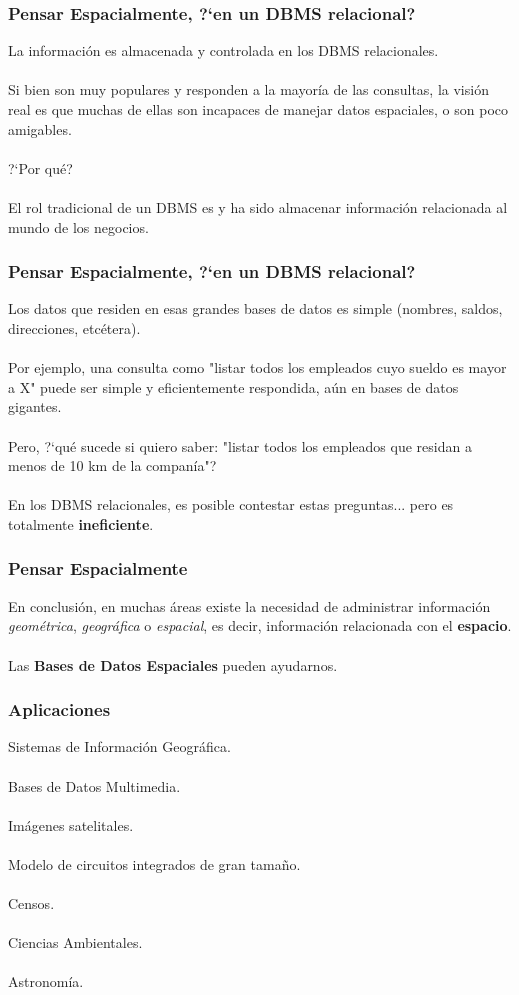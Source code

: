 \documentclass[12pt]{beamer}
\begin{document}
\begin{frame}
\frametitle{Pensar Espacialmente, ?`en un DBMS relacional?}
La informaci\'on es almacenada y controlada en los DBMS relacionales.\\
\ \\
Si bien son muy populares y responden a la mayor\'ia de las consultas, la visi\'on real es que muchas de ellas son incapaces de manejar datos espaciales, o son poco amigables.\\
\ \\
?`Por qu\'e?\\
\ \\
El rol tradicional de un DBMS es y ha sido almacenar informaci\'on relacionada al mundo de los negocios.
\end{frame}


\begin{frame}
\frametitle{Pensar Espacialmente, ?`en un DBMS relacional?}
Los datos que residen en esas grandes bases de datos es simple (nombres, saldos, direcciones, etc\'etera).\\
\ \\
Por ejemplo, una consulta como "listar todos los empleados cuyo sueldo es mayor a X" puede ser simple y eficientemente respondida, a\'un en bases de datos gigantes.\\
\ \\
Pero, ?`qu\'e sucede si quiero saber: "listar todos los empleados que residan a menos de 10 km de la compan\'ia"?\\
\ \\
En los DBMS relacionales, es posible contestar estas preguntas... pero es totalmente \textbf{ineficiente}.
\end{frame}


\begin{frame}
\frametitle{Pensar Espacialmente}
En conclusi\'on, en muchas \'areas existe la necesidad de administrar informaci\'on \textit{geom\'etrica}, \textit{geogr\'afica} o \textit{espacial}, es decir, informaci\'on relacionada con el \textbf{espacio}.\\
\ \\
Las \textbf{Bases de Datos Espaciales} pueden ayudarnos.
\end{frame}

\begin{frame}
\frametitle{Aplicaciones}
Sistemas de Informaci\'on Geogr\'afica.\\
\ \\
Bases de Datos Multimedia.\\
\ \\
Im\'agenes satelitales.\\
\ \\
Modelo de circuitos integrados de gran tama\~no.\\
\ \\
Censos.\\
\ \\
Ciencias Ambientales.\\
\ \\
Astronom\'ia.
\end{frame}
\end{document}
